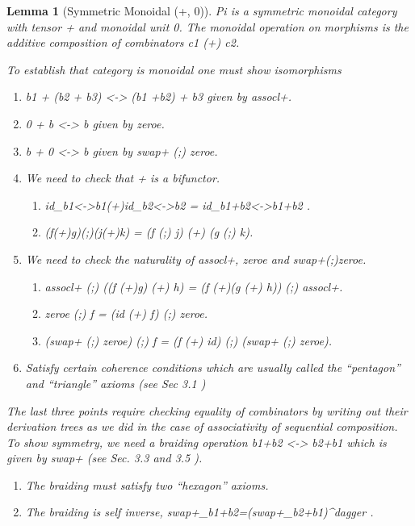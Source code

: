 \documentclass[preprint]{sigplanconf}
\newtheorem{lemma}[theorem]{Lemma}
\newenvironment{proof}[1][Proof.]{\begin{trivlist}\item[\hskip \labelsep {\bfseries #1}]}{\end{trivlist}}
\begin{document}
\begin{lemma}[Symmetric Monoidal (+, 0)]
  {{Pi}} is a symmetric monoidal category with tensor {{+}} and
  monoidal unit {{0}}. The monoidal operation on morphisms is the
  additive composition of combinators {{c1 (+) c2}}.

  \begin{proof}
    To establish that category is monoidal one must show isomorphisms
    \begin{enumerate}
    \item {{b1 + (b2 + b3) <-> (b1 +b2) + b3}} given by {{assocl+}}.
    \item {{0 + b <-> b}} given by {{zeroe}}.
    \item {{b + 0 <-> b}} given by {{swap+ (;) zeroe}}.
    \item We need to check that {{+}} is a bifunctor. 
      \begin{enumerate}
      \item {{id_{b1<->b1}(+)id_{b2<->b2} = id_{b1+b2<->b1+b2} }}.
      \item {{(f(+)g)(;)(j(+)k) = (f (;) j) (+) (g (;) k)}}.
      \end{enumerate}
    \item We need to check the naturality of {{assocl+}}, {{zeroe}} and
      {{swap+(;)zeroe}}.
      \begin{enumerate}
      \item {{assocl+ (;) ((f (+)g) (+) h) = (f (+)(g (+) h)) (;) assocl+}}.
      \item {{zeroe (;) f = (id (+) f) (;) zeroe}}.
      \item {{(swap+ (;) zeroe) (;) f = (f (+) id) (;) (swap+ (;) zeroe)}}.
      \end{enumerate}
    \item Satisfy certain coherence conditions which are usually
      called the ``pentagon'' and ``triangle'' axioms (see Sec 3.1
      \cite{springerlink:10.1007/978-3-642-12821-94})
    \end{enumerate}

    The last three points require checking equality of combinators by
    writing out their derivation trees as we did in the case of
    associativity of sequential composition. To show symmetry, we need
    a braiding operation {{b1+b2 <-> b2+b1}} which is given by
    {{swap+}} (see Sec. 3.3 and 3.5
    \cite{springerlink:10.1007/978-3-642-12821-94}).

    \begin{enumerate}
    \item The braiding must satisfy two ``hexagon'' axioms.
    \item The braiding is self inverse,
      {{swap+_{b1+b2}=(swap+_{b2+b1})^{dagger} }}.
    \end{enumerate}


  \end{proof}

\end{lemma}
\end{document}
